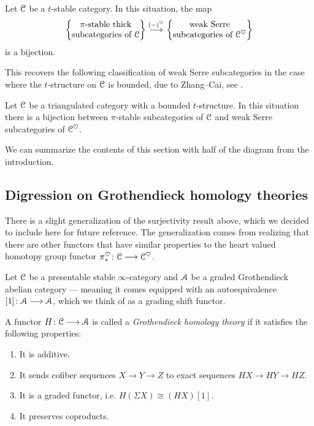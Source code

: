 \begin{proposition}
    \label{ch3:prop:classification-weak-serre}
    Let $\EuScript{C}$ be a $t$-stable category. In this situation, the map 
    \[\left\{ \begin{matrix} \pi\text{-stable thick}\\ \text{subcategories of }\EuScript{C} \end{matrix} \right\}\overset{(-)^\heartsuit}{\longrightarrow} \left\{ \begin{matrix} \text{weak Serre}\\ \text{subcategories of }\EuScript{C}^\heartsuit \end{matrix} \right\}\] 
    is a bijection. 
\end{proposition}

This recovers the following classification of weak Serre subcategories in the case where the $t$-structure on $\EuScript{C}$ is bounded, due to Zhang--Cai, see \cite{zhang-cai_2017}. 

\begin{corollary}
    \label{ch3:cor:classification-weak-serre-bounded}
    Let $\EuScript{C}$ be a triangulated category with a bounded $t$-structure. In this situation there is a bijection between $\pi$-stable subcategories of $\EuScript{C}$ and weak Serre subcategories of $\EuScript{C}^\heartsuit$.  
\end{corollary}

We can summarize the contents of this section with half of the diagram from the introduction. 

\begin{center}
\end{center}

\subsection*{Digression on Grothendieck homology theories}

There is a slight generalization of the surjectivity result above, which we decided to include here for future reference. The generalization comes from realizing that there are other functors that have similar properties to the heart valued homotopy group functor $\pi_*^\heartsuit \colon \EuScript{C}\longrightarrow \EuScript{C}^\heartsuit$. 

Let $\EuScript{C}$ be a presentable stable $\infty$-category and $\EuScript{A}$ be a graded Grothendieck abelian category --- meaning it comes equipped with an autoequivalence $[1]\colon \EuScript{A}\longrightarrow \EuScript{A}$, which we think of as a grading shift functor. 

\begin{definition}
    A functor $H\colon \EuScript{C}\longrightarrow \EuScript{A}$ is called a \emph{Grothendieck homology theory} if it satisfies the following properties:
    \begin{enumerate}
        \item It is additive.
        \item It sends cofiber sequences $X\rightarrow Y \rightarrow Z$ to exact sequences $HX\rightarrow HY\rightarrow HZ$.
        \item It is a graded functor, i.e. $H(\Sigma X) \cong (HX)[1]$.
        \item It preserves coproducts. 
    \end{enumerate}
\end{definition}

